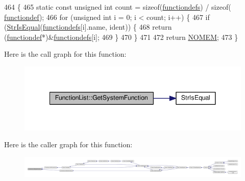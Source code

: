 \begin{DoxyCode}
464 \{
465     \textcolor{keyword}{static} \textcolor{keyword}{const} \textcolor{keywordtype}{unsigned} \textcolor{keywordtype}{int} count = \textcolor{keyword}{sizeof}(\hyperlink{functiondefs_8h_a60118af1b6a3c96367614016418cc6ea}{functiondefs}) / \textcolor{keyword}{sizeof}(
      \hyperlink{structfunctiondef}{functiondef});
466     \textcolor{keywordflow}{for} (\textcolor{keywordtype}{unsigned} \textcolor{keywordtype}{int} i = 0; i < count; i++) \{
467         \textcolor{keywordflow}{if} (\hyperlink{clib_8h_a2a1f39d11cbbaac992d42e67557dac4b}{StrIsEqual}(\hyperlink{functiondefs_8h_a60118af1b6a3c96367614016418cc6ea}{functiondefs}[i].name, ident)) \{
468             \textcolor{keywordflow}{return} (\hyperlink{structfunctiondef}{functiondef}*)&\hyperlink{functiondefs_8h_a60118af1b6a3c96367614016418cc6ea}{functiondefs}[i];
469         \}
470     \}
471 
472     \textcolor{keywordflow}{return} \hyperlink{platform_8h_a46ff2bfbf0d44b8466a2251d5bd5e6f8}{NOMEM};
473 \}
\end{DoxyCode}


Here is the call graph for this function\+:
\nopagebreak
\begin{figure}[H]
\begin{center}
\leavevmode
\includegraphics[width=341pt]{d1/d79/classFunctionList_aabcebb1bdf56aee163f96483dcdc603c_cgraph}
\end{center}
\end{figure}




Here is the caller graph for this function\+:
\nopagebreak
\begin{figure}[H]
\begin{center}
\leavevmode
\includegraphics[width=350pt]{d1/d79/classFunctionList_aabcebb1bdf56aee163f96483dcdc603c_icgraph}
\end{center}
\end{figure}


